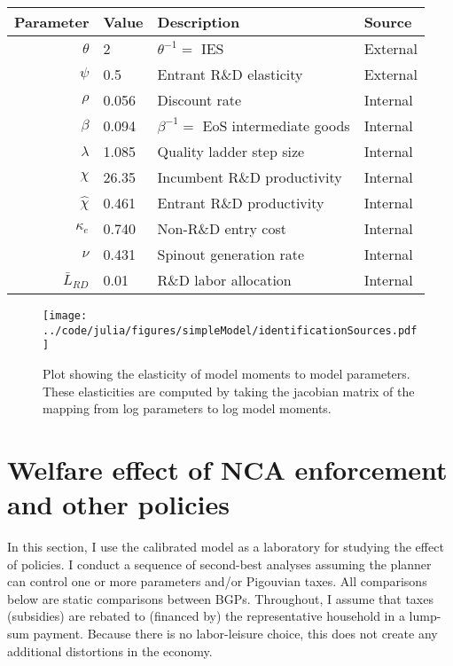\documentclass[11pt,english]{article}
\theoremstyle{definition}
\begin{document}
\begin{table}[]
	\centering
	\label{calibration_parameters}
	\begin{tabular}{rlll}
		\toprule \toprule
		Parameter & Value & Description & Source \tabularnewline
		\midrule
		$\theta$ & 2 & $\theta^{-1} = $ IES & External \tabularnewline
		$\psi$ & 0.5 & Entrant R\&D elasticity & External \tabularnewline
		$\rho$ & 0.056 & Discount rate  & Internal \tabularnewline
		$\beta$ & 0.094 & $\beta^{-1} = $ EoS intermediate goods & Internal \tabularnewline 
		$\lambda$ & 1.085 & Quality ladder step size & Internal \tabularnewline
		$\chi$ & 26.35 & Incumbent R\&D productivity & Internal \tabularnewline
		$\hat{\chi}$ & 0.461 & Entrant R\&D productivity & Internal \tabularnewline 
		$\kappa_e$ & 0.740 & Non-R\&D entry cost & Internal \tabularnewline
		$\nu$ & 0.431 & Spinout generation rate  & Internal\tabularnewline
		$\bar{L}_{RD}$ & 0.01 & R\&D labor allocation  & Internal \tabularnewline
		\bottomrule
	\end{tabular}
\end{table}

\begin{figure}[]
	\centering
	\texttt{[image: ../code/julia/figures/simpleModel/identificationSources.pdf]}
	\caption{Plot showing the elasticity of model moments to model parameters. These elasticities are computed by taking the jacobian matrix of the mapping from log parameters to log model moments.}
	\label{calibration_identificationSources}
\end{figure}

\section{Welfare effect of NCA enforcement and other policies}\label{sec:policy_analysis}

In this section, I use the calibrated model as a laboratory for studying the effect of policies. I conduct a sequence of second-best analyses assuming the planner can control one or more parameters and/or Pigouvian taxes. All comparisons below are static comparisons between BGPs. Throughout, I assume that taxes (subsidies) are rebated to (financed by) the representative household in a lump-sum payment.  Because there is no labor-leisure choice, this does not create any additional distortions in the economy. 
\end{document}
